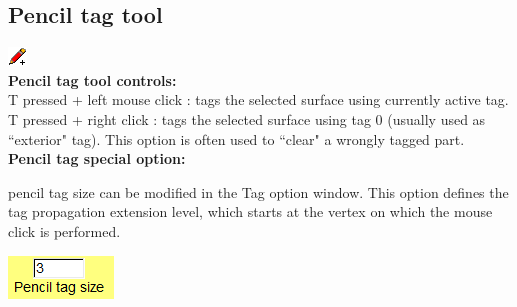 \subsection{Pencil tag tool}
\includegraphics[scale=0.7]{images/pixmap/pencil.png}\\
\textbf{Pencil tag tool controls:}\\
T pressed + left mouse click : tags the selected surface using currently active tag.\\
T pressed + right click : tags the selected surface using tag 0 (usually used as ``exterior" tag). This option is often used to ``clear" a wrongly tagged part.\\
\textbf{Pencil tag special option:}\\
\noindent
\begin{minipage}{0.6\textwidth}
pencil tag size can be modified in the Tag option window. This
option defines the tag propagation extension level, which starts at
the vertex on which the mouse click is performed.
\end{minipage}    
\begin{minipage}{0.4\textwidth}\centering
  \includegraphics[scale=0.5]{images/Tags/Pencil_tag_size.png}
 \end{minipage} 
\noindent



